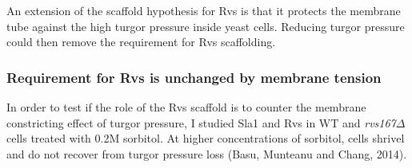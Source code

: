 
An extension of the scaffold hypothesis for Rvs is that it protects the membrane tube against the high turgor pressure inside yeast cells. Reducing turgor pressure could then remove the requirement for Rvs scaffolding.

	\subsubsection{Requirement for Rvs is unchanged by membrane tension}

	In order to test if the role of the Rvs scaffold is to counter the membrane constricting effect of turgor pressure, I studied Sla1 and Rvs in WT and \textit{rvs167$\Delta$} cells treated with 0.2M sorbitol. At higher concentrations of sorbitol, cells shrivel and do not recover from turgor pressure loss (Basu, Munteanu and Chang, 2014).

